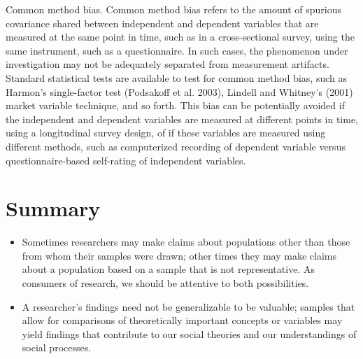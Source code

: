 Common method bias. Common method bias refers to the amount of spurious covariance shared between independent and dependent variables that are measured at the same point in time, such as in a cross-sectional survey, using the same instrument, such as a questionnaire. In such cases, the phenomenon under investigation may not be adequately separated from measurement artifacts. Standard statistical tests are available to test for common method bias, such as Harmon’s single-factor test (Podsakoff et al. 2003), Lindell and Whitney’s (2001) market variable technique, and so forth. This bias can be potentially avoided if the independent and dependent variables are measured at different points in time, using a longitudinal survey design, of if these variables are measured using different methods, such as computerized recording of dependent variable versus questionnaire-based self-rating of independent variables.

\section{Summary}\label{08:summary}

\begin{itemize}
	\setlength{\itemsep}{0pt}
	\setlength{\parskip}{0pt}
	\setlength{\parsep}{0pt}
	
	\item Sometimes researchers may make claims about populations other than those from whom their samples were drawn; other times they may make claims about a population based on a sample that is not representative. As consumers of research, we should be attentive to both possibilities.
	\item A researcher’s findings need not be generalizable to be valuable; samples that allow for comparisons of theoretically important concepts or variables may yield findings that contribute to our social theories and our understandings of social processes.
	
\end{itemize}

\printbibliography
